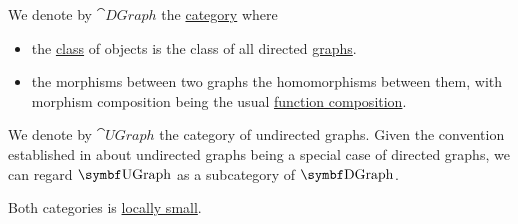 \begin{definition}\label{def:category_of_graphs}
  We denote by \( \cat{DGraph} \) the \hyperref[def:category]{category} where
  \begin{itemize}
    \item the \hyperref[def:set_zfc]{class} of objects is the class of all directed \hyperref[def:directed_graph]{graphs}.
    \item the morphisms between two graphs the homomorphisms between them, with morphism composition being the usual \hyperref[def:function/composition]{function composition}.
  \end{itemize}

  We denote by \( \cat{UGraph} \) the category of undirected graphs. Given the convention established in  about undirected graphs being a special case of directed graphs, we can regard \( \bfop{UGraph} \) as a subcategory of \( \bfop{DGraph} \).

  Both categories is \hyperref[def:category_cardinality]{locally small}.
\end{definition}
